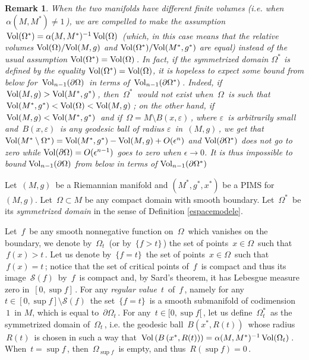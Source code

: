 \documentclass[11pt, reqno]{amsart}
\newtheorem{remarque}[theoreme]{Remark}
\theoremstyle{plain}
\begin{document}
\begin{remarque}\rm\label{Volrelatifs} When the two manifolds have different finite volumes
(i.e. when $\,\alpha (M, M^*) \neq 1\,$), we are compelled
to make the assumption $\, {\rm Vol} (\Omega^*) = \alpha (M,M^*)^{-1}\, {\rm Vol} (\Omega)\,$
(which, in this case means that the relative volumes 
${\rm Vol}(\Omega)/ {\rm Vol}(M,g)$  and ${\rm Vol}(\Omega^*)/ {\rm Vol}(M^*,g^*)$ are equal) instead of the usual
assumption $ {\rm Vol} (\Omega^*) = {\rm Vol} (\Omega)\,$.
In fact, if the symmetrized domain $\Omega^*$ is defined by the equality ${\rm Vol} (\Omega^{*}) = {\rm Vol} (\Omega)$,
it is hopeless to expect some bound from below for $\, {\rm Vol}_{n-1}(\partial \Omega)\,$ in terms of 
$\, {\rm Vol}_{n-1}(\partial \Omega^{*})\,$. Indeed, if 
$\, {\rm Vol} (M, g) > {\rm Vol} (M^*,g^*)\,$,
then $\,\Omega^{*}\,$ would not exist when $\,\Omega\,$ is such that
$\, {\rm Vol} (M^*,g^*) < {\rm Vol} (\Omega) < {\rm Vol} (M,g)\,$; on the other hand, 
if $\, {\rm Vol} (M, g) < {\rm Vol} (M^*,g^*)\,$ and if 
$\,\Omega = M \setminus B(x , \varepsilon)\,$, where $\varepsilon\,$ is arbitrarily small and
$\,B(x , \varepsilon)\,$ is any geodesic ball of radius $\varepsilon\,$ in $\,(M,g)\,$, we get that
 ${\rm Vol}(M^* \setminus \Omega^*) = {\rm Vol}(M^*, g^*) - {\rm Vol}(M, g) + O(\epsilon^n)$ and ${\rm Vol}(\partial\Omega^*)$ does not go to zero 
while ${\rm Vol}(\partial \Omega) = O(\epsilon^{n-1})$ goes to zero when $\epsilon \rightarrow 0$. It is thus impossible to bound ${\rm Vol}_{n-1}(\partial\Omega)$ from below in terms of ${\rm Vol}_{n-1}(\partial\Omega^*)$
\end{remarque}

Let $\,(M,g)\,$ be a Riemannian manifold  and $(M^*,g^*, x^*)$ be a PIMS for $(M, g)$.
 Let $\,\Omega\subset M$ be any compact
domain with smooth boundary.  Let $\,\Omega^*\,$ be its {\em symmetrized domain}
in the sense of Definition \ref{espacemodele}.

Let $\,f\,$ be any smooth nonnegative function
on $\,\Omega \,$ which vanishes on the boundary, we denote by $\,\Omega_t\,$ (or by
$\,\{f>t\}\,$) the set of points $\,x \in \Omega\,$ such that $\,f(x) > t\,$. Let us
denote by $\,\{f = t\}\,$ the set of points $\,x \in \Omega\,$ such that $\,f(x) = t\,$;
notice that the set of critical points of $\,f\,$ is compact and thus its image $\,{\mathcal S} (f)\,$
by $\,f\,$ is compact and, by Sard's theorem, it has Lebesgue measure zero in
$\, [0 , \sup f]\,$. For any {\em  regular value} $\,t\,$ of $\,f\,$, namely for any   $t\in  [0 , \sup f] \setminus {\mathcal S} (f)\,$ the set 
$\,\{f = t\}\,$ is a smooth submanifold of codimension $\,1\,$ in $M$, which is
equal to $\,\partial \Omega_t\,$.
For any $\, t \in [0 , \sup f [\,$, let us define $\,\Omega_t^*\,$ as the symmetrized 
domain of $\,\Omega_t\,$,  i.e. the geodesic
ball $\,B\left(x^* , R(t)\right) \,$ whose radius $\,R(t) \,$ is chosen in such a way that
$\, {\rm Vol} \left(B\left(x^* , R(t)\right) \right) = \alpha (M,M^*)^{-1}\,{\rm Vol} (\Omega_t)\,$.
When $\,t = \sup f \,$, then $\,\Omega_{\sup f }\,$ is empty, and thus $\,R(\sup f ) = 0\,$.
\end{document}
